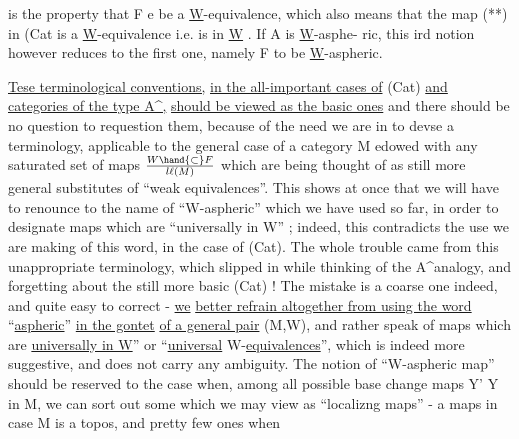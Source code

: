 
is the property that F\hand{$\to$} e be a \underline{W}-equivalence, which also means that
the map (**) in (Cat\hand{)} is a \underline{W}-equivalence i.e. is in \underline{W} . If A is \underline{W}-asphe-%
ric, this ird notion however reduces to the first one, namely F to
be \underline{W}-aspheric.

\uline{Tese terminological conventions,} \uline{in the all-important cases of}
(Cat) \uline{and categories of the type A\textasciicircum,} \uline{should be viewed as the basic ones}\hand{,}
and there should be no question  to requestion them, because  of the
need we  are in to devse a terminology, applicable to the general
case of a category M edowed with any saturated set of maps $W \hand{\subset} F\over{l}{\ell}(M)$\hand{,}
\hand{(}which are being thought of as still more general substitutes of ``weak
equivalences''\hand{)}. This shows at once that we will have to renounce to the
name of ``W-aspheric'' which we have used so far, in order to designate
maps which are ``universally in W'' ; indeed, this contradicts the use we
are making of this word, in the case of (Cat). The whole trouble came
from this unappropriate terminology, which slipped in while thinking
of the A\textasciicircum\hand{/}analogy, and forgetting about the still more basic (Cat) !
The mistake is a coarse one indeed, and quite easy to correct - \uline{we}
\uline{better refrain altogether from using the word} ``\uline{aspheric}'' \uline{in the gontet}
\uline{of a general pair} (M,W),  and rather speak of maps which are
\uline{universally in W}'' or ``\uline{universal} W-\uline{equivalences}'', which is indeed more
suggestive, and does not carry any ambiguity. The notion of ``W-aspheric
map'' should be reserved to the case when, among all possible base change
maps Y' \hand{$\to$}Y in M, we can sort out some which we may view as ``localizng
maps'' - a maps  in case M is a topos, and pretty few ones when

